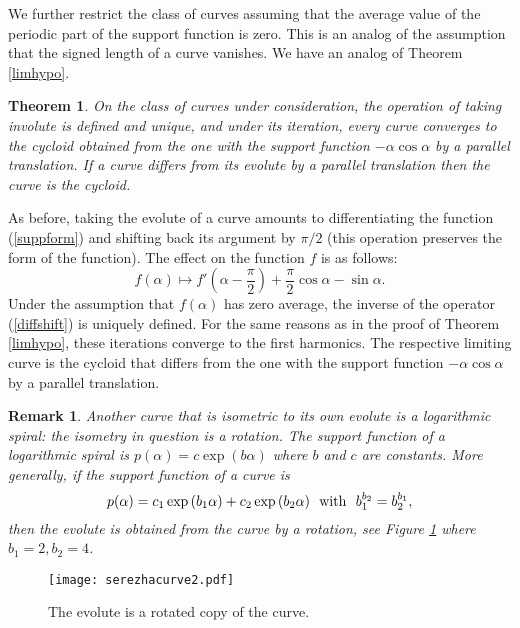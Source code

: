 \documentclass[12pt]{article}
\makeatletter
\newtheorem{theorem}{Theorem}
\newtheorem{remark}[lemma]{Remark}
\renewenvironment{proof}[1][\proofname] 
{\par\pushQED{\qed}\normalfont\topsep6\p@\@plus6\p@\relax\trivlist\item[\hskip\labelsep\bfseries#1\@addpunct{.}]\ignorespaces}{\popQED\endtrivlist\@endpefalse}
\makeatother
\begin{document}
We further restrict the class of curves assuming that the average value of the periodic part of the support function is zero. This is an analog of the assumption that the signed length of a curve vanishes. We have an analog of Theorem \ref{limhypo}. 

\begin{theorem}
\label{limcycl}
On the class of curves under consideration, the operation of taking involute is defined and unique, and under its iteration, every curve converges to the cycloid obtained from the one with the support function  $-\alpha \cos\alpha$ by a parallel translation. If a curve differs 
from its evolute by a parallel translation then the curve is the cycloid.
\end{theorem}

\begin{proof} 
As before, taking the evolute of a curve amounts to differentiating the function (\ref{suppform}) and shifting back its argument by $\pi/2$ (this operation preserves the form of the function). The effect on the function $f$ is as follows:
\begin{equation}
\label{diffshift}
f(\alpha) \mapsto f'\left(\alpha-\frac{\pi}{2}\right) + \frac{\pi}{2} \cos\alpha-\sin\alpha.
\end{equation}
Under the assumption that $f(\alpha)$ has zero average, the inverse of the operator (\ref{diffshift}) is uniquely defined. For the same reasons as in the proof of Theorem \ref{limhypo}, these iterations converge to the first harmonics. The respective limiting curve is the cycloid that differs from the one with the support function $-\alpha \cos\alpha$ by a parallel translation.
\end{proof}

\begin{remark}
{\rm Another curve that is isometric to its own evolute is a logarithmic spiral: the isometry in question is a rotation. The support function of a logarithmic spiral is $p(\alpha)=c \exp{(b\alpha)}$ where $b$ and $c$ are constants. More generally, if the support function of a curve is
$$
p(\alpha)=c_1 \exp{(b_1\alpha)}+c_2 \exp{(b_2\alpha)}\ \ {\rm with}\ \ b_1^{b_2}=b_2^{b_1},
$$ 
then the evolute is obtained from the curve by a rotation, see Figure \ref{selfrot} where $b_1=2, b_2=4$.
}
\end{remark}
\begin{figure}[hbtp]
	\centering
	\texttt{[image: serezhacurve2.pdf]}
	\caption{The evolute is a rotated copy of the curve.}
	\label{selfrot}
\end{figure}
\end{document}
